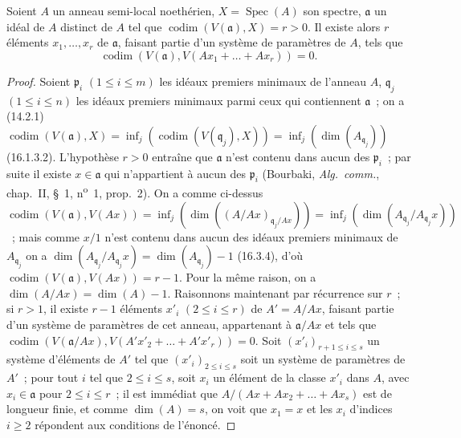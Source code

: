 
\begin{proposition}[16.3.8]
\label{0.16.3.8-fr}
Soient $A$ un anneau semi-local noethérien, $X=\operatorname{Spec}(A)$ son
spectre, $\mathfrak{a}$ un idéal de $A$ distinct de $A$ tel que
$\operatorname{codim}(V(\mathfrak{a}),X)=r>0$. Il existe alors $r$ éléments
$x_1,\ldots,x_r$ de $\mathfrak{a}$, faisant partie d'un système de paramètres
de $A$, tels que
\[
  \operatorname{codim}(V(\mathfrak{a}),
  V(Ax_1+\ldots+Ax_r))=0.
\]
\end{proposition}

\begin{proof}
Soient $\mathfrak{p}_i$ $(1\leq i\leq m)$ les idéaux premiers minimaux de
l'anneau $A$, $\mathfrak{q}_j$ $(1\leq i\leq n)$ les idéaux premiers minimaux
parmi ceux qui contiennent $\mathfrak{a}$~; on a (14.2.1)
$\operatorname{codim}(V(\mathfrak{a}),X)=\inf_j(\operatorname{codim}(V(\mathfrak{q}_j),X))=\inf_j(\dim(A_{\mathfrak{q}_j}))$
(16.1.3.2). L'hypothèse $r>0$ entraîne que $\mathfrak{a}$ n'est contenu dans
aucun des $\mathfrak{p}_i$~; par suite il existe $x\in\mathfrak{a}$ qui
n'appartient à aucun des $\mathfrak{p}_i$ (Bourbaki, \emph{Alg.~comm.},
chap.~II, \S~1, n\textsuperscript{o}~1, prop.~2). On a comme ci-dessus
$\operatorname{codim}(V(\mathfrak{a}),V(Ax))=\inf_j(\dim((A/Ax)_{\mathfrak{q}_j/Ax}))=\inf_j(\dim(A_{\mathfrak{q}_j}/A_{\mathfrak{q}_j}x))$~;
mais comme $x/1$ n'est contenu dans aucun des idéaux premiers minimaux de
$A_{\mathfrak{q}_j}$ on a
$\dim(A_{\mathfrak{q}_j}/A_{\mathfrak{q}_j}x)
=\dim(A_{\mathfrak{q}_j})-1$ (16.3.4), d'où
$\operatorname{codim}(V(\mathfrak{a}),V(Ax))=r-1$. Pour la même raison, on a
$\dim(A/Ax)=\dim(A)-1$. Raisonnons maintenant par récurrence sur $r$~; si
$r>1$, il existe $r-1$ éléments $x'_i$ $(2\leq i\leq r)$ de $A'=A/Ax$,
faisant partie d'un système de paramètres de cet anneau, appartenant à
$\mathfrak{a}/Ax$ et tels que
$\operatorname{codim}(V(\mathfrak{a}/Ax),V(A'x'_2+\ldots+A'x'_r))=0$.
Soit $(x'_i)_{r+1\leq i\leq s}$ un système d'éléments de $A'$ tel que
$(x'_i)_{2\leq i\leq s}$ soit un système de paramètres de $A'$~; pour tout
$i$ tel que $2\leq i\leq s$, soit $x_i$ un élément de la classe $x'_i$ dans
$A$, avec $x_i\in\mathfrak{a}$ pour $2\leq i\leq r$~; il est immédiat que
$A/(Ax+Ax_2+\ldots+Ax_s)$ est de longueur finie, et comme $\dim(A)=s$, on voit
que $x_1=x$ et les $x_i$ d'indices $i\geq2$ répondent aux conditions de
l'énoncé.
\end{proof}

